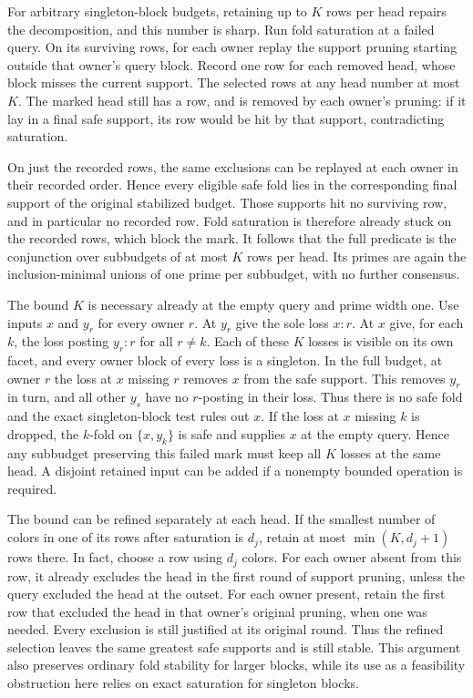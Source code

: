 For arbitrary singleton-block budgets, retaining up to
$K$ rows per head repairs the decomposition, and this
number is sharp. Run fold saturation at a failed query.
On its surviving rows, for each owner replay the support
pruning starting outside that owner's query block.
Record one row for each removed head, whose block
misses the current support. The selected rows at any
head number at most $K$. The marked head still has a
row, and is removed by each owner's pruning: if it lay
in a final safe support, its row would be hit by that
support, contradicting saturation.

On just the recorded rows, the same exclusions can be
replayed at each owner in their recorded order. Hence
every eligible safe fold lies in the corresponding
final support of the original stabilized budget. Those
supports hit no surviving row, and in particular no
recorded row. Fold saturation is therefore already
stuck on the recorded rows, which block the mark.
It follows that the full predicate is the conjunction
over subbudgets of at most $K$ rows per head. Its primes
are again the inclusion-minimal unions of one prime
per subbudget, with no further consensus.

The bound $K$ is necessary already at the empty query
and prime width one. Use inputs $x$ and $y_r$ for every
owner $r$. At $y_r$ give the sole loss $x:r$. At $x$
give, for each $k$, the loss posting $y_r:r$ for all
$r\ne k$. Each of these $K$ losses is visible on its
own facet, and every owner block of every loss is a
singleton. In the full budget, at owner $r$ the loss
at $x$ missing $r$ removes $x$ from the safe support.
This removes $y_r$ in turn, and all other $y_s$ have
no $r$-posting in their loss. Thus there is no safe fold
and the exact singleton-block test rules out $x$.
If the loss at $x$ missing $k$ is dropped, the $k$-fold
on $\{x,y_k\}$ is safe and supplies $x$ at the empty
query. Hence any subbudget preserving this failed
mark must keep all $K$ losses at the same head. A
disjoint retained input can be added if a nonempty
bounded operation is required.

The bound can be refined separately at each head. If the
smallest number of colors in one of its rows after saturation
is $d_j$, retain at most $\min(K,d_j+1)$ rows there. In fact,
choose a row using $d_j$ colors. For each owner absent from
this row, it already excludes the head in the first round
of support pruning, unless the query excluded the head at
the outset. For each owner present, retain the first row
that excluded the head in that owner's original pruning,
when one was needed. Every exclusion is still justified
at its original round. Thus the refined selection leaves
the same greatest safe supports and is still stable. This
argument also preserves ordinary fold stability for larger
blocks, while its use as a feasibility obstruction here
relies on exact saturation for singleton blocks.

